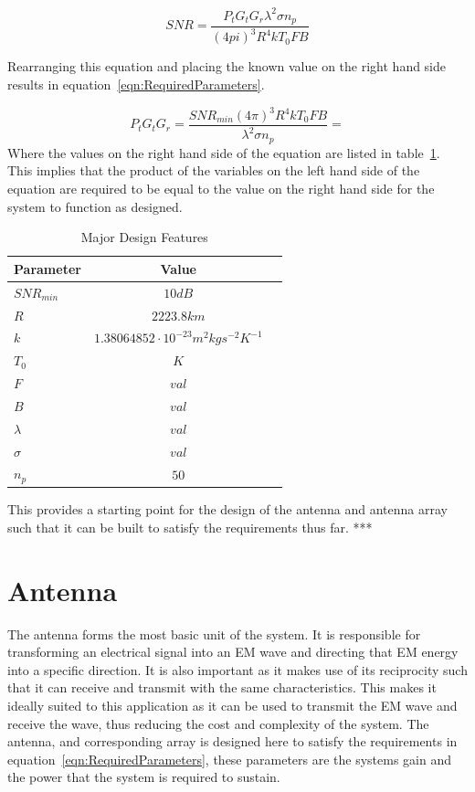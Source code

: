 \documentclass[11pt]{witseiepaper}
\begin{document}
\begin{equation} \label{eqn:SNR}
SNR = \frac{P_{t} G_{t} G_{r} \lambda^2 \sigma n_p}{(4 pi)^3 R^4 k T_0 F B}
\end{equation}


Rearranging this equation and placing the known value on the right hand side results in equation~\ref{eqn:RequiredParameters}.

\begin{equation} \label{eqn:RequiredParameters}
P_{t} G_{t} G_{r} = \frac{SNR_{min} (4 \pi )^3 R^4 k T_{0} F B}{{\lambda}^2 \sigma n_p} = 
\end{equation}
Where the values on the right hand side of the equation are listed in table~\ref{tab:DesignValues}.
This implies that the product of the variables on the left hand side of the equation are required to be equal to the value on the right hand side for the system to function as designed.

\begin{table}[htb]
    \caption{Major Design Features}
    \label{tab:DesignValues}
    \begin{center}
        \begin{tabular}{p{70mm}cp{70mm}}
            \hline 
            Parameter & Value \\
            \hline
            $SNR_{min}$ & $10 dB$ \\
            $R$ & $2223.8 km$ \\
            $k$ & $1.38064852 \cdot 10^{-23} m^2 kg s^{-2} K^{-1}$ \\
            $T_{0}$ & $K$ \\
            $F$ & $val$ \\
            $B$ & $val$ \\
            $\lambda$ & $val$ \\
            $\sigma$ & $val$ \\
            $n_p$ & $50$ \\
            \hline
        \end{tabular}
    \end{center}
\end{table}


This provides a starting point for the design of the antenna and antenna array such that it can be built to satisfy the requirements thus far.
***

\section{Antenna} \label{sec:Antenna}
The antenna forms the most basic unit of the system. It is responsible for transforming an electrical signal into an EM wave and directing that EM energy into a specific direction. It is also important as it makes use of its reciprocity such that it can receive and transmit with the same characteristics. This makes it ideally suited to this application as it can be used to transmit the EM wave and receive the wave, thus reducing the cost and complexity of the system.
The antenna, and corresponding array is designed here to satisfy the requirements in equation~\ref{eqn:RequiredParameters}, these parameters are the systems gain and the power that the system is required to sustain.
\end{document}
